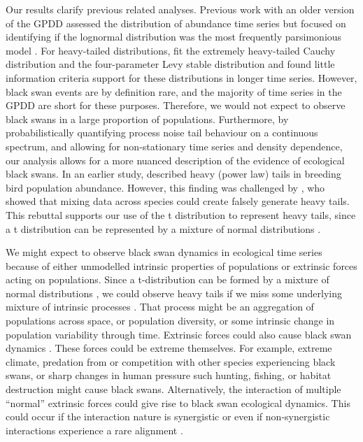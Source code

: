 Our results clarify previous related analyses. Previous work with an older
version of the GPDD assessed the distribution of abundance time series but
focused on identifying if the lognormal distribution was the most frequently
parsimonious model \citep{halley2002}. For heavy-tailed distributions,
\citet{halley2002} fit the extremely heavy-tailed Cauchy distribution and the
four-parameter Levy stable distribution and found little information criteria
support for these distributions in longer time series. However, black swan
events are by definition rare, and the majority of time series in the GPDD are
short for these purposes. Therefore, we would not expect to observe black swans
in a large proportion of populations. Furthermore, by probabilistically
quantifying process noise tail behaviour on a continuous spectrum, and allowing
for non-stationary time series and density dependence, our analysis allows for
a more nuanced description of the evidence of ecological black swans. In an
earlier study, \citet{keitt1998} described heavy (power law) tails in breeding
bird population abundance. However, this finding was challenged by
\citet{allen2001}, who showed that mixing data across species could create
falsely generate heavy tails. This rebuttal supports our use of the
t distribution to represent heavy tails, since a t distribution can be
represented by a mixture of normal distributions \citep[with
inverse-gamma-distributed variances,][]{gelman2014}.

We might expect to observe black swan dynamics in ecological time series
because of either unmodelled intrinsic properties of populations or extrinsic
forces acting on populations. Since a t-distribution can be formed by a mixture
of normal distributions \citep{gelman2014}, we could observe heavy tails if we
miss some underlying mixture of intrinsic processes \citep{allen2001}. That
process might be an aggregation of populations across space, or population
diversity, or some intrinsic change in population variability through time.
Extrinsic forces could also cause black swan dynamics
\citep[e.g.][]{nunez2012}. These forces could be extreme themselves. For
example, extreme climate, predation from or competition with other species
experiencing black swans, or sharp changes in human pressure such hunting,
fishing, or habitat destruction might cause black swans. Alternatively, the
interaction of multiple ``normal'' extrinsic forces could give rise to black
swan ecological dynamics. This could occur if the interaction nature is
synergistic \citep[e.g.][]{kirby2009} or even if non-synergistic interactions
experience a rare alignment \citep{denny2009}.

